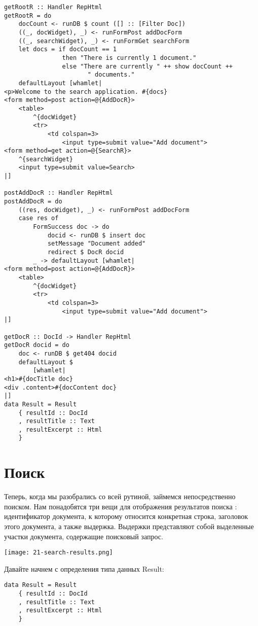 \begin{lstlisting}
getRootR :: Handler RepHtml
getRootR = do
    docCount <- runDB $ count ([] :: [Filter Doc])
    ((_, docWidget), _) <- runFormPost addDocForm
    ((_, searchWidget), _) <- runFormGet searchForm
    let docs = if docCount == 1
                then "There is currently 1 document."
                else "There are currently " ++ show docCount ++
                       " documents."
    defaultLayout [whamlet|
<p>Welcome to the search application. #{docs}
<form method=post action=@{AddDocR}>
    <table>
        ^{docWidget}
        <tr>
            <td colspan=3>
                <input type=submit value="Add document">
<form method=get action=@{SearchR}>
    ^{searchWidget}
    <input type=submit value=Search>
|]

postAddDocR :: Handler RepHtml
postAddDocR = do
    ((res, docWidget), _) <- runFormPost addDocForm
    case res of
        FormSuccess doc -> do
            docid <- runDB $ insert doc
            setMessage "Document added"
            redirect $ DocR docid
        _ -> defaultLayout [whamlet|
<form method=post action=@{AddDocR}>
    <table>
        ^{docWidget}
        <tr>
            <td colspan=3>
                <input type=submit value="Add document">
|]

getDocR :: DocId -> Handler RepHtml
getDocR docid = do
    doc <- runDB $ get404 docid
    defaultLayout $
        [whamlet|
<h1>#{docTitle doc}
<div .content>#{docContent doc}
|]
data Result = Result
    { resultId :: DocId
    , resultTitle :: Text
    , resultExcerpt :: Html
    }
\end{lstlisting}%

\section{Поиск} %

Теперь, когда мы разобрались со всей рутиной, займемся непосредственно поиском. Нам понадобятся три вещи для отображения  результатов поиска : идентификатор документа, к которому относится конкретная строка, заголовок этого документа, а также выдержка. Выдержки представляют собой выделенные участки документа, содержащие поисковый запрос.

\texttt{[image: 21-search-results.png]} %

Давайте начнем с определения типа данных Result:

\begin{lstlisting}
data Result = Result
    { resultId :: DocId
    , resultTitle :: Text
    , resultExcerpt :: Html
    }
\end{lstlisting}

